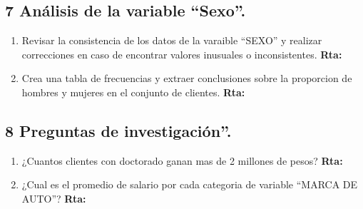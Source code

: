 \documentclass[
]{article}
\begin{document}
\newpage

\subsection{7 Análisis de la variable
``Sexo''.}\label{anuxe1lisis-de-la-variable-sexo.}

\begin{enumerate}
\def\labelenumi{\alph{enumi}.}
\item
  Revisar la consistencia de los datos de la varaible ``SEXO'' y
  realizar correcciones en caso de encontrar valores inusuales o
  inconsistentes. \textbf{Rta:}
\item
  Crea una tabla de frecuencias y extraer conclusiones sobre la
  proporcion de hombres y mujeres en el conjunto de clientes.
  \textbf{Rta:}
\end{enumerate}

\newpage

\subsection{8 Preguntas de
investigación''.}\label{preguntas-de-investigaciuxf3n.}

\begin{enumerate}
\def\labelenumi{\alph{enumi}.}
\setcounter{enumi}{2}
\item
  ¿Cuantos clientes con doctorado ganan mas de 2 millones de pesos?
  \textbf{Rta:}
\item
  ¿Cual es el promedio de salario por cada categoria de variable ``MARCA
  DE AUTO''? \textbf{Rta:}
\end{enumerate}
\end{document}
